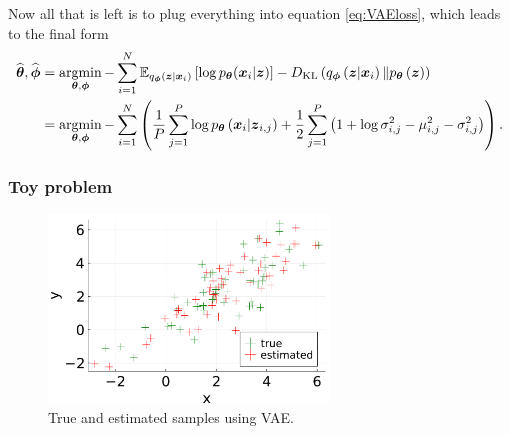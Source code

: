 Now all that is left is to plug everything into equation \eqref{eq:VAEloss}, which leads to the final form
\begin{align}\label{řešení_VAE}
 \widehat{\boldsymbol{\theta}}, \widehat{\boldsymbol{\phi}} & = \mathop{\mathrm{argmin}}_{\boldsymbol{\theta},\boldsymbol{\phi}}-\sum_{i=1}^N\mathbb{E}_{q_{\boldsymbol{\phi}}\left(\boldsymbol{z}\vert \boldsymbol{x}_i \right)}\left[\log p_{\boldsymbol{\theta}}(\boldsymbol{x}_i\vert \boldsymbol{z}) \right] - D_{\mathrm{KL}}\left(q_{\boldsymbol{\phi}}\left(\boldsymbol{z}\vert\boldsymbol{x}_i \right) \Vert p_{\boldsymbol{\theta}}\left(\boldsymbol{z}\right)\right) \\ \label{VAE:finalargmin}
 & = \mathop{\mathrm{argmin}}_{\boldsymbol{\theta}, \boldsymbol{\phi}}-\sum_{i = 1}^N\left(\frac{1}{P}\sum_{j = 1}^P \log p_{\boldsymbol{\theta}}\left(\boldsymbol{x}_i\vert \boldsymbol{z}_{i,j}\right) +   \frac{1}{2}\sum_{j=1}^P\left(1 + \log\sigma^2_{i,j} -\mu_{i,j}^2 -\sigma_{i,j}^2 \right)\right).
\end{align}


\subsubsection{Toy problem}
\begin{figure}
\includegraphics[width=7.5cm]{plots/Images/VAE_example.pdf}
\caption{True and estimated samples using VAE.}%
	\label{fig:VAE_example}%
\end{figure} 

